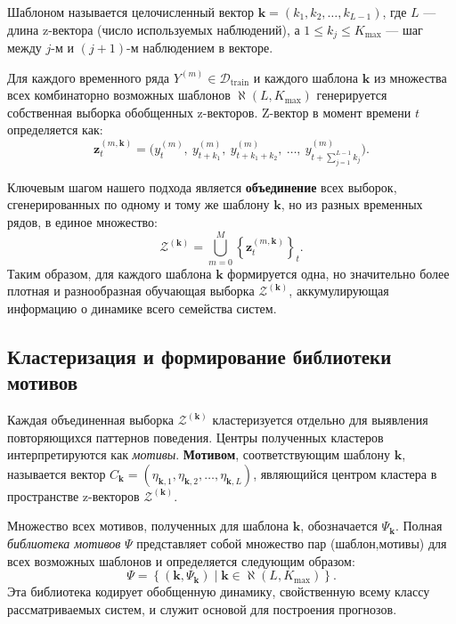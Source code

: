 \documentclass[a4paper,12pt]{extarticle}
\begin{document}
Шаблоном называется целочисленный вектор $\boldsymbol{k} = (k_1, k_2, \dots, k_{L-1})$,
 где $L$ — длина z-вектора (число используемых наблюдений), а $1 \le k_j \le K_{\max}$ — шаг между $j$-м и $(j+1)$-м наблюдением в векторе.

Для каждого временного ряда $Y^{(m)} \in \mathcal{D}_{\text{train}}$ и каждого шаблона
 $\boldsymbol{k}$ из множества всех комбинаторно возможных шаблонов $\aleph(L, K_{\max})$
  генерируется собственная выборка обобщенных z-векторов. Z-вектор в момент времени $t$ определяется как:
\[
\mathbf{z}_{t}^{(m, \boldsymbol{k})} = \bigl(y^{(m)}_t,\ y^{(m)}_{t+k_1},\ y^{(m)}_{t+k_1+k_2},\ \dots,\ y^{(m)}_{t + \sum_{j=1}^{L-1} k_j}\bigr).
\]


Ключевым шагом нашего подхода является \textbf{объединение} всех выборок, сгенерированных
 по одному и тому же шаблону $\boldsymbol{k}$, но из разных временных рядов, в единое множество:
\[
\mathcal{Z}^{(\boldsymbol{k})} = \bigcup_{m=0}^{M} \left\{ \mathbf{z}_{t}^{(m, \boldsymbol{k})} \right\}_{t}.
\]
Таким образом, для каждого шаблона $\boldsymbol{k}$ формируется одна, но значительно
 более плотная и разнообразная обучающая выборка $\mathcal{Z}^{(\boldsymbol{k})}$,
  аккумулирующая информацию о динамике всего семейства систем.

\subsection{Кластеризация и формирование библиотеки мотивов}

Каждая объединенная выборка $\mathcal{Z}^{(\boldsymbol{k})}$ кластеризуется отдельно
 для выявления повторяющихся паттернов поведения. Центры полученных кластеров
  интерпретируются как \textit{мотивы}.
\textbf{Мотивом}, соответствующим шаблону $\boldsymbol{k}$,
 называется вектор $C_{\boldsymbol{k}} = (\eta_{\boldsymbol{k},1},
 \eta_{\boldsymbol{k},2}, \dots, \eta_{\boldsymbol{k},L})$, являющийся
 центром кластера в пространстве z-векторов $\mathcal{Z}^{(\boldsymbol{k})}$.

Множество всех мотивов, полученных для шаблона $\boldsymbol{k}$,
обозначается $\Psi_{\boldsymbol{k}}$. Полная \textit{библиотека мотивов}
 $\Psi$ представляет собой множество пар (шаблон,мотивы) для всех возможных
  шаблонов и определяется следующим образом:
\[
\Psi = \left\{ (\boldsymbol{k}, \Psi_{\boldsymbol{k}}) \mid \boldsymbol{k}
\in \aleph(L, K_{\max}) \right\}.
\]
Эта библиотека кодирует обобщенную динамику, свойственную всему классу рассматриваемых
 систем, и служит основой для построения прогнозов.
\end{document}

